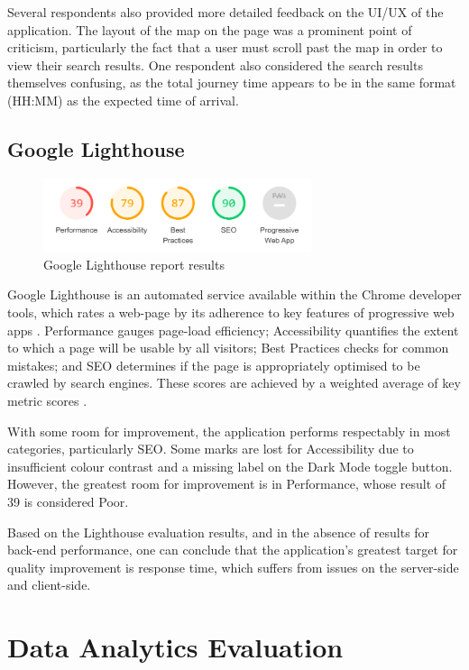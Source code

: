 \documentclass[]{UCD_CS_47360_Report}
\begin{document}
Several respondents also provided more detailed feedback on the UI/UX of the application.
The layout of the map on the page was a prominent point of criticism, particularly the fact that a user must scroll past the map in order to view their search results.
One respondent also considered the search results themselves confusing, as the total journey time appears to be in the same format (HH:MM) as the expected time of arrival.

\subsection{Google Lighthouse}

\begin{figure}[!htb]
    \centering
    \includegraphics[width=0.7\textwidth]{figures/Google-Lighthouse_results_reduced.png}
    \caption{Google Lighthouse report results}
    \label{fig:GLResults}
\end{figure}

Google Lighthouse is an automated service available within the Chrome developer tools, which rates a web-page by its adherence to key features of progressive web apps \cite{Lighthouse}.
Performance gauges page-load efficiency; Accessibility quantifies the extent to which a page will be usable by all visitors; Best Practices checks for common mistakes; and SEO determines if the page is appropriately optimised to be crawled by search engines. These scores are achieved by a weighted average of key metric scores \cite{Lighthouse-Score}.

With some room for improvement, the application performs respectably in most categories, particularly SEO.
Some marks are lost for Accessibility due to insufficient colour contrast and a missing label on the Dark Mode toggle button.
However, the greatest room for improvement is in Performance, whose result of 39 is considered Poor.

Based on the Lighthouse evaluation results, and in the absence of results for back-end performance, one can conclude that the application’s greatest target for quality improvement is response time, which suffers from issues on the server-side and client-side.

\section{Data Analytics Evaluation}\label{DA-eval}
\end{document}
